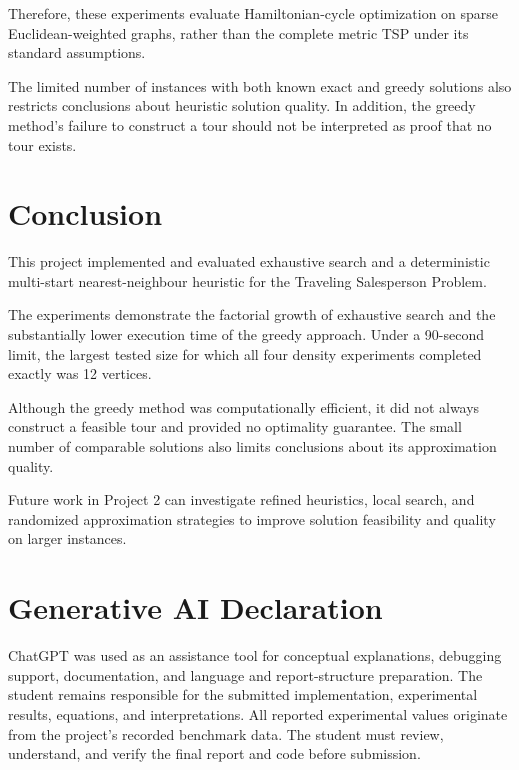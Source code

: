 \documentclass[english,times,final,mirror,longpaper]{revdetua}
\begin{document}
Therefore, these experiments evaluate Hamiltonian-cycle
optimization on sparse Euclidean-weighted graphs, rather than
the complete metric TSP under its standard assumptions.

The limited number of instances with both known exact and
greedy solutions also restricts conclusions about heuristic
solution quality. In addition, the greedy method's failure to
construct a tour should not be interpreted as proof that no
tour exists.

\section{Conclusion}

This project implemented and evaluated exhaustive search and
a deterministic multi-start nearest-neighbour heuristic for
the Traveling Salesperson Problem.

The experiments demonstrate the factorial growth of exhaustive
search and the substantially lower execution time of the greedy
approach. Under a 90-second limit, the largest tested size for
which all four density experiments completed exactly was
12 vertices.

Although the greedy method was computationally efficient, it
did not always construct a feasible tour and provided no
optimality guarantee. The small number of comparable solutions
also limits conclusions about its approximation quality.

Future work in Project 2 can investigate refined heuristics,
local search, and randomized approximation strategies to improve
solution feasibility and quality on larger instances.

\section*{Generative AI Declaration}

ChatGPT was used as an assistance tool for conceptual
explanations, debugging support, documentation, and language
and report-structure preparation. The student remains responsible
for the submitted implementation, experimental results, equations,
and interpretations. All reported experimental values originate
from the project's recorded benchmark data. The student must
review, understand, and verify the final report and code before
submission.



\end{document}
